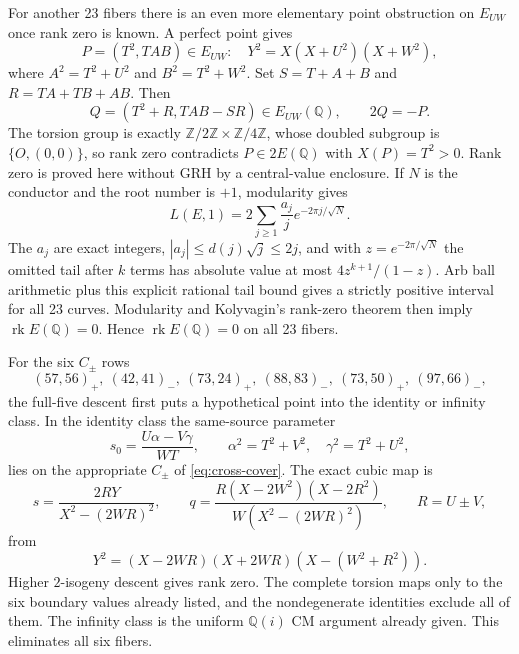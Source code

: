 \documentclass[11pt,a4paper]{amsart}
\newcommand{\Q}{\mathbb Q}
\newcommand{\Z}{\mathbb Z}
\newcommand{\rk}{\operatorname{rk}}
\begin{document}
For another 23 fibers there is an even more elementary point obstruction on $E_{UW}$ once rank zero is known. A perfect point gives
\[
P=(T^2,TAB)\in E_{UW}:\quad Y^2=X(X+U^2)(X+W^2),
\]
where $A^2=T^2+U^2$ and $B^2=T^2+W^2$. Set $S=T+A+B$ and $R=T A+T B+AB$. Then
\begin{equation}\label{eq:double-point}
Q=(T^2+R,TAB-SR)\in E_{UW}(\Q),\qquad 2Q=-P.
\end{equation}
The torsion group is exactly $\Z/2\Z\times\Z/4\Z$, whose doubled subgroup is $\{O,(0,0)\}$, so rank zero contradicts $P\in2E(\Q)$ with $X(P)=T^2>0$. Rank zero is proved here without GRH by a central-value enclosure. If $N$ is the conductor and the root number is $+1$, modularity gives
\[
L(E,1)=2\sum_{j\ge1}\frac{a_j}{j}e^{-2\pi j/\sqrt N}.
\]
The $a_j$ are exact integers, $|a_j|\le d(j)\sqrt j\le2j$, and with $z=e^{-2\pi/\sqrt N}$ the omitted tail after $k$ terms has absolute value at most $4z^{k+1}/(1-z)$. Arb ball arithmetic plus this explicit rational tail bound gives a strictly positive interval for all 23 curves. Modularity \cite{BCDT} and Kolyvagin's rank-zero theorem \cite{Kolyvagin} then imply $\rk E(\Q)=0$. Hence $\rk E(\Q)=0$ on all 23 fibers.

For the six $C_\pm$ rows
\[
(57,56)_{+},\ (42,41)_{-},\ (73,24)_{+},\ (88,83)_{-},\ (73,50)_{+},\ (97,66)_{-},
\]
the full-five descent first puts a hypothetical point into the identity or infinity class. In the identity class the same-source parameter
\[
s_0=\frac{U\alpha-V\gamma}{WT},\qquad
\alpha^2=T^2+V^2,\quad\gamma^2=T^2+U^2,
\]
lies on the appropriate $C_\pm$ of \eqref{eq:cross-cover}. The exact cubic map is
\[
s=\frac{2RY}{X^2-(2WR)^2},\qquad
q=\frac{R(X-2W^2)(X-2R^2)}{W(X^2-(2WR)^2)},\qquad R=U\pm V,
\]
from
\[
Y^2=(X-2WR)(X+2WR)(X-(W^2+R^2)).
\]
Higher $2$-isogeny descent gives rank zero. The complete torsion maps only to the six boundary values already listed, and the nondegenerate identities exclude all of them. The infinity class is the uniform $\Q(i)$ CM argument already given. This eliminates all six fibers.
\end{document}
